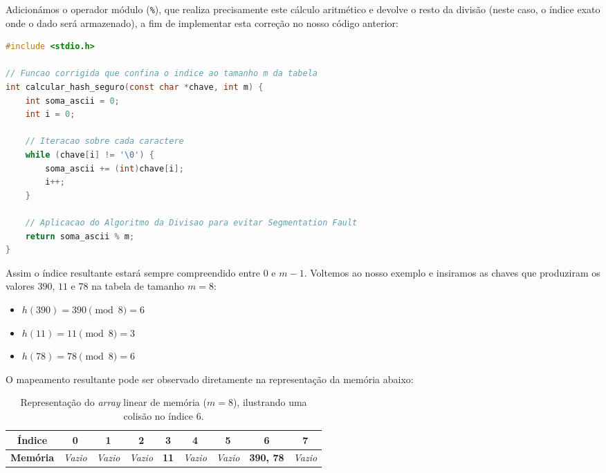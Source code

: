 \documentclass[12pt, a4paper]{article}
\begin{document}
Adicionámos o operador módulo (\texttt{\%}), que realiza precisamente este cálculo aritmético e devolve o resto da divisão (neste caso, o índice exato onde o dado será armazenado),
a fim de implementar esta correção no nosso código anterior:

\begin{lstlisting}[language=C, caption={Função de dispersão corrigida com a aplicação do Algoritmo da Divisão.}]
#include <stdio.h>

// Funcao corrigida que confina o indice ao tamanho m da tabela
int calcular_hash_seguro(const char *chave, int m) {
    int soma_ascii = 0;
    int i = 0;

    // Iteracao sobre cada caractere
    while (chave[i] != '\0') {
        soma_ascii += (int)chave[i];
        i++;
    }

    // Aplicacao do Algoritmo da Divisao para evitar Segmentation Fault
    return soma_ascii % m;
}
\end{lstlisting}

Assim o índice resultante estará sempre compreendido entre $0$ e $m-1$. Voltemos ao nosso exemplo e insiramos as chaves que 
produziram os valores $390$, $11$ e $78$ na tabela de tamanho $m = 8$:

\begin{itemize}
    \item $h(390) = 390 \pmod{8} = 6$
    \item $h(11) = 11 \pmod{8} = 3$
    \item $h(78) = 78 \pmod{8} = 6$
\end{itemize}

O mapeamento resultante pode ser observado diretamente na representação da memória abaixo:

\begin{table}[H]
    \centering
    \def\arraystretch{1.5}
    \setlength{\tabcolsep}{5.5pt}
    \begin{tabular}{|c|c|c|c|c|c|c|c|c|}
        \hline
        \textbf{Índice} & 0 & 1 & 2 & 3 & 4 & 5 & 6 & 7 \\ \hline
        \textbf{Memória} & \textit{Vazio} & \textit{Vazio} & \textit{Vazio} & \textbf{11} & \textit{Vazio} & \textit{Vazio} & \textbf{390, 78} & \textit{Vazio} \\ \hline
    \end{tabular}
    \caption{Representação do \textit{array} linear de memória ($m=8$), ilustrando uma colisão no índice 6.}\label{tab:hash_visual}
\end{table}
\end{document}
